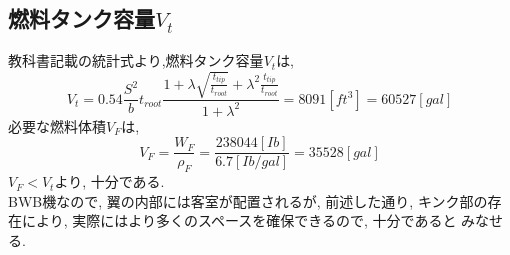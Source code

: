 \documentclass[class=article, crop=false, dvipdfmx, fleqn]{standalone}
\begin{document}
\subsection{燃料タンク容量$V_t$}
教科書記載の統計式より,燃料タンク容量$V_t$は,
\begin{equation}
  V_t = 0.54\frac{S^2}{b}t_{root}\frac{1+\lambda \sqrt{\frac{t_{tip}}{t_{root}}} +
  \lambda^2 \frac{t_{tip}}{t_{root}}}{1 + \lambda^2}
  = 8091[ft^3] = 60527[gal]
\end{equation}
必要な燃料体積$V_F$は,
\begin{equation}
  V_F = \frac{W_F}{\rho_F} = \frac{238044[Ib]}{6.7[Ib/gal]} = 35528[gal]
\end{equation}
$V_F < V_t$より, 十分である. \\
BWB機なので, 翼の内部には客室が配置されるが, 前述した通り, キンク部の存在により, 実際にはより多くのスペースを確保できるので, 十分であると
みなせる.
\end{document}
